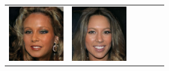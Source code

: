 \documentclass{article}
\newcommand{\pganw}{0.95in}
\begin{document}
\begin{table}[htbp]
\begin{center}
\begin{tabular}{cc|cc|cc}
\includegraphics[width=\pganw]{figures/pgan/49_base_iso_reject.jpg} &
\includegraphics[width=\pganw]{figures/pgan/48_base_iso_MH.jpg} &

\end{tabular}
\end{center}
\end{table}
\end{document}
